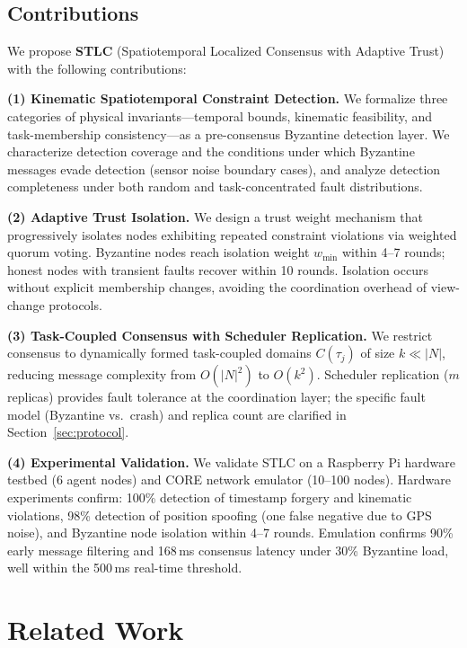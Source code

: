 \documentclass[manuscript,screen,review]{acmart}
\begin{document}
\subsection{Contributions}
We propose \textbf{STLC} (Spatiotemporal Localized Consensus with Adaptive Trust) with the following contributions:

\textbf{(1) Kinematic Spatiotemporal Constraint Detection.} We formalize three categories of physical invariants---temporal bounds, kinematic feasibility, and task-membership consistency---as a pre-consensus Byzantine detection layer. We characterize detection coverage and the conditions under which Byzantine messages evade detection (sensor noise boundary cases), and analyze detection completeness under both random and task-concentrated fault distributions.

\textbf{(2) Adaptive Trust Isolation.} We design a trust weight mechanism that progressively isolates nodes exhibiting repeated constraint violations via weighted quorum voting. Byzantine nodes reach isolation weight $w_{\min}$ within 4--7 rounds; honest nodes with transient faults recover within 10 rounds. Isolation occurs without explicit membership changes, avoiding the coordination overhead of view-change protocols.

\textbf{(3) Task-Coupled Consensus with Scheduler Replication.} We restrict consensus to dynamically formed task-coupled domains $C(\tau_j)$ of size $k \ll |N|$, reducing message complexity from $O(|N|^2)$ to $O(k^2)$. Scheduler replication ($m$ replicas) provides fault tolerance at the coordination layer; the specific fault model (Byzantine vs.\ crash) and replica count are clarified in Section~\ref{sec:protocol}.

\textbf{(4) Experimental Validation.} We validate STLC on a Raspberry Pi hardware testbed (6 agent nodes) and CORE network emulator (10--100 nodes). Hardware experiments confirm: 100\% detection of timestamp forgery and kinematic violations, 98\% detection of position spoofing (one false negative due to GPS noise), and Byzantine node isolation within 4--7 rounds. Emulation confirms 90\% early message filtering and 168\,ms consensus latency under 30\% Byzantine load, well within the 500\,ms real-time threshold.
\section{Related Work}
\label{sec:related}
\end{document}
